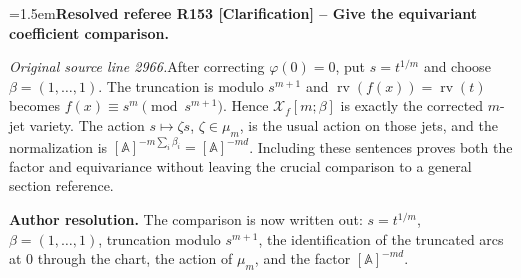 \documentclass[12pt]{amsart}
\newcommand{\ResolvedRefereeRemark}[5]{%
  \par\medskip\begingroup\normalfont\small\color{gray}%
  \emergencystretch=1.5em\noindent\textbf{Resolved referee R#1 [#2] -- #3.}\par\nobreak\noindent #4\par
  \medskip\color{ResolutionGreen}\noindent\textbf{Author resolution.} #5\par
  \endgroup\medskip
}
\theoremstyle{plain}
\theoremstyle{definition}
\theoremstyle{remark}
\numberwithin{equation}{section}
\theoremstyle{plain}
\newcommand{\A}{\mathds{A}}
\newcommand{\0}{\emptyset}
\newcommand{\mdl}[1]{\mathcal{#1}}  %
\DeclareMathOperator{\rv}{rv}
\begin{document}
\ResolvedRefereeRemark{153}{Clarification}{Give the equivariant coefficient comparison}{%
\textit{Original source line 2966.}\quad After correcting $\varphi(0)=0$, put $s=t^{1/m}$ and choose $\beta=(1,\ldots,1)$. The truncation is modulo $s^{m+1}$ and $\rv(f(x))=\rv(t)$ becomes $f(x)\equiv s^m\pmod{s^{m+1}}$. Hence $\mdl X_f[m;\beta]$ is exactly the corrected $m$-jet variety. The action $s\mapsto\zeta s$, $\zeta\in\mu_m$, is the usual action on those jets, and the normalization is $[\A]^{-m\sum_i\beta_i}=[\A]^{-md}$. Including these sentences proves both the factor and equivariance without leaving the crucial comparison to a general section reference.
}{The comparison is now written out: $s=t^{1/m}$, $\beta=(1,\ldots,1)$, truncation modulo $s^{m+1}$, the identification of the truncated arcs at $0$ through the chart, the action of $\mu_m$, and the factor $[\A]^{-md}$.}
\end{document}
